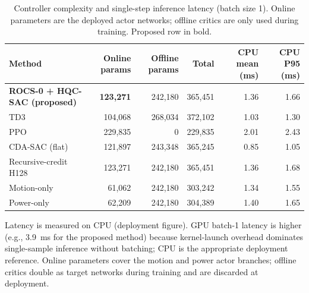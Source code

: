 \begin{table}[t]
\centering
\caption{Controller complexity and single-step inference latency (batch size 1). Online parameters are the deployed actor networks; offline critics are only used during training. Proposed row in bold.}
\label{tab:complexity}
\begin{tabular}{@{}lrrrrr@{}}
\toprule
Method & Online params & Offline params & Total & CPU mean (ms) & CPU P95 (ms) \\
\midrule
\textbf{ROCS-0 + HQC-SAC (proposed)} & \textbf{123{,}271} & 242{,}180 & 365{,}451 & 1.36 & 1.66 \\
TD3 & 104{,}068 & 268{,}034 & 372{,}102 & 1.03 & 1.30 \\
PPO & 229{,}835 & 0 & 229{,}835 & 2.01 & 2.43 \\
CDA-SAC (flat) & 121{,}897 & 243{,}348 & 365{,}245 & 0.85 & 1.05 \\
Recursive-credit H128 & 123{,}271 & 242{,}180 & 365{,}451 & 1.36 & 1.68 \\
Motion-only & 61{,}062 & 242{,}180 & 303{,}242 & 1.34 & 1.55 \\
Power-only & 62{,}209 & 242{,}180 & 304{,}389 & 1.40 & 1.65 \\
\bottomrule
\end{tabular}
\begin{flushleft}\footnotesize
Latency is measured on CPU (deployment figure). GPU batch-1 latency is higher (e.g., 3.9~ms for the proposed method) because kernel-launch overhead dominates single-sample inference without batching; CPU is the appropriate deployment reference. Online parameters cover the motion and power actor branches; offline critics double as target networks during training and are discarded at deployment.
\end{flushleft}
\end{table}
